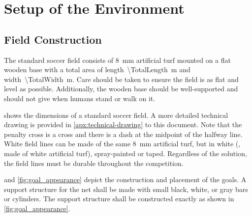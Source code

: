 \section{Setup of the Environment}
\label{sec:setup_environment}

\subsection{Field Construction}
\label{sec:field_dim}

The standard soccer field consists of \qty{8}{\milli\metre} artificial turf mounted on a flat wooden base with a total area of length~\qty{\TotalLength}{\metre} and width~\qty{\TotalWidth}{\metre}. Care should be taken to ensure the field is as flat and level as possible. Additionally, the wooden base should be well-supported and should not give when humans stand or walk on it.

 shows the dimensions of a standard soccer field.
A more detailed technical drawing is provided in \cref{apx:technical-drawing} to this document.
Note that the penalty cross is a cross and there is a dash at the midpoint of the halfway line. White field lines can be made of the same \qty{8}{\milli\metre} artificial turf, but in white (\ie, made of white artificial turf), spray-painted or taped. Regardless of the solution, the field lines must be durable throughout the competition.

 and \cref{fig:goal_appearance} depict the construction and placement of the goals. A support structure for the net shall be made with small black, white, or gray bars or cylinders.  The support structure shall be constructed exactly as shown in \cref{fig:goal_appearance}.

